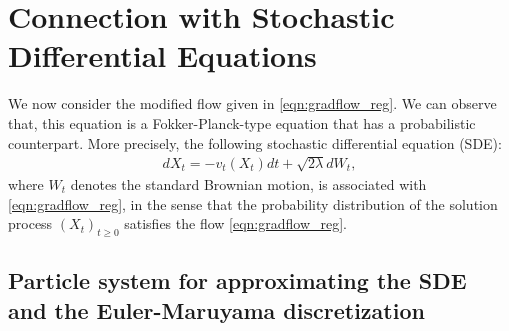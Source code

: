 


\section{Connection with Stochastic Differential Equations}

We now consider the modified flow given in \eqref{eqn:gradflow_reg}. We can observe that, this equation is a Fokker-Planck-type equation that has a probabilistic counterpart. More precisely, the following stochastic differential equation (SDE):
\begin{align}
d X_t = - v_t(X_t) dt + \sqrt{2 \lambda } d W_t, \label{eqn:sde}
\end{align}
where $W_t$ denotes the standard Brownian motion, is associated with \eqref{eqn:gradflow_reg}, in the sense that the probability distribution of the solution process $(X_t)_{t\geq0}$ satisfies the flow \eqref{eqn:gradflow_reg}.  



\subsection{Particle system for approximating the SDE and the Euler-Maruyama discretization}

